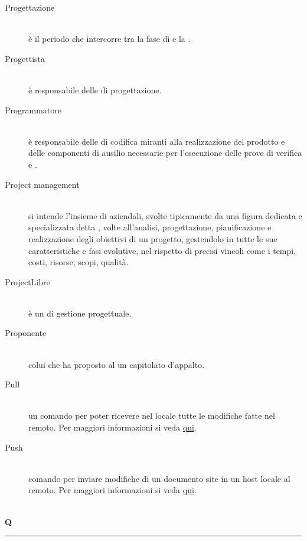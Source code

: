 \documentclass[12pt,a4paper]{article}
\begin{document}
\begin{description}
\item[Progettazione] 
\hfill\\ è il periodo che intercorre tra la fase di \FAD e la \RP.

\item[Progettista] 
\hfill\\ è responsabile delle  di progettazione.

\item[Programmatore] 
\hfill\\ è responsabile delle  di codifica miranti alla realizzazione del prodotto e delle componenti di ausilio necessarie per l'esecuzione delle prove di verifica e .

\item[Project management] 
\hfill\\ si intende l'insieme di  aziendali, svolte tipicamente da una figura dedicata e specializzata detta , volte all'analisi, progettazione, pianificazione e realizzazione degli obiettivi di un progetto, gestendolo in tutte le sue caratteristiche e fasi evolutive, nel rispetto di precisi vincoli come i tempi, costi, risorse, scopi, qualità.

\item[ProjectLibre] 
\hfill\\ è un  di gestione progettuale.

\item[Proponente] 
\hfill\\ colui che ha proposto al  un capitolato d'appalto.

\item[Pull] 
\hfill\\ un comando  per poter ricevere nel locale tutte le modifiche fatte nel  remoto. Per maggiori informazioni si veda \href{https://git-scm.com/docs/}{qui}.

\item[Push] 
\hfill\\ comando  per inviare modifiche di un documento site in un host locale al  remoto. Per maggiori informazioni si veda \href{https://git-scm.com/docs/}{qui}.
\end{description}

\newpage

\begin{center}
\hfill\\
	\LARGE \textbf{Q}
\hfill\\
\rule[15pt]{30pt}{0.5pt}
\end{center}
\end{document}
